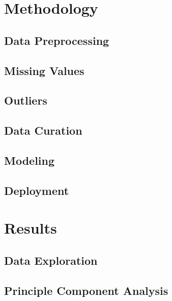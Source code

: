 \documentclass[11pt,]{article}
\begin{document}
\hypertarget{methodology}{%
\section{Methodology}\label{methodology}}

\hypertarget{data-preprocessing}{%
\subsection{Data Preprocessing}\label{data-preprocessing}}

\hypertarget{missing-values}{%
\subsection{Missing Values}\label{missing-values}}

\hypertarget{outliers}{%
\subsection{Outliers}\label{outliers}}

\hypertarget{data-curation}{%
\subsection{Data Curation}\label{data-curation}}

\hypertarget{modeling}{%
\subsection{Modeling}\label{modeling}}

\hypertarget{deployment}{%
\subsection{Deployment}\label{deployment}}

\hypertarget{results}{%
\section{Results}\label{results}}

\hypertarget{data-exploration}{%
\subsection{Data Exploration}\label{data-exploration}}

\hypertarget{principle-component-analysis}{%
\subsection{Principle Component
Analysis}\label{principle-component-analysis}}
\end{document}
